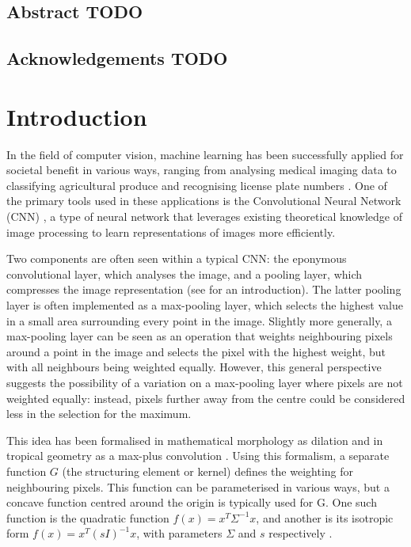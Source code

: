 \documentclass[a4paper, 12pt]{report}
\def\comment#1{\color{red}#1\color{black}}
\begin{document}
\newpage



\setcounter{page}{1}
\pagestyle{plain} 

\section*{Abstract \comment{TODO}}


\section*{Acknowledgements \comment{TODO}}


\tableofcontents

\chapter{Introduction}
In the field of computer vision, machine learning has been successfully applied for societal benefit in various ways, ranging from analysing medical imaging data \cite{esteva2021deep, jain2015computer} to classifying agricultural produce \cite{wan2020faster, sivaranjani2022overview} and recognising license plate numbers \cite{xie2018new}. One of the primary tools used in these applications is the Convolutional Neural Network (CNN) \cite{le1990handwritten}, a type of neural network that leverages existing theoretical knowledge of image processing to learn representations of images more efficiently.

Two components are often seen within a typical CNN: the eponymous convolutional layer, which analyses the image, and a pooling layer, which compresses the image representation (see \cite{introconvnets} for an introduction). The latter pooling layer is often implemented as a max-pooling layer, which selects the highest value in a small area surrounding every point in the image. Slightly more generally, a max-pooling layer can be seen as an operation that weights neighbouring pixels around a point in the image and selects the pixel with the highest weight, but with all neighbours being weighted equally. However, this general perspective suggests the possibility of a variation on a max-pooling layer where pixels are not weighted equally: instead, pixels further away from the centre could be considered less in the selection for the maximum.

This idea has been formalised in mathematical morphology as dilation \cite{heijmans1996morphological} and in tropical geometry as a max-plus convolution \cite{maragos}. Using this formalism, a separate function $G$ (the structuring element or kernel) defines the weighting for neighbouring pixels. This function can be parameterised in various ways, but a concave function centred around the origin is typically used for G. One such function is the quadratic function $f(x)=x^T\Sigma^{-1}x$, and another is its isotropic form $f(x)=x^T(sI)^{-1}x$, with parameters $\Sigma$ and $s$ respectively \cite{Boomgaard1999NumericalSS}.
\end{document}
